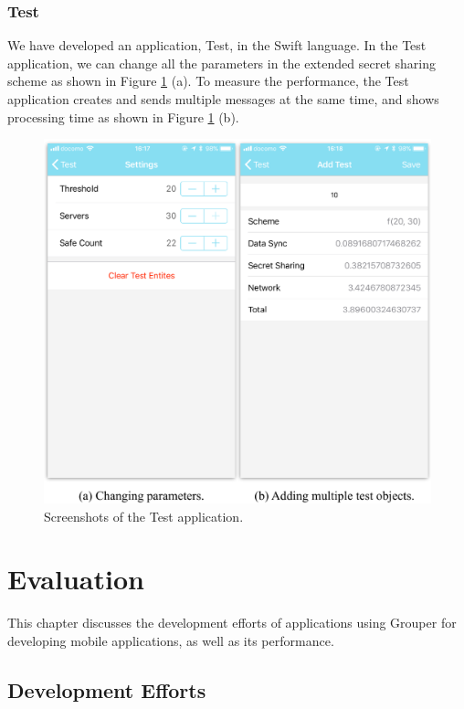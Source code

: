 \documentclass[a4paper,11pt]{report}
\begin{document}
\subsection{Test}

We have developed an application, Test, in the Swift language.
In the Test application, we can change all the parameters in the extended secret sharing scheme as shown in Figure \ref{fig:test} (a).
To measure the performance, the Test application creates and sends multiple messages at the same time, and shows processing time as shown in Figure \ref{fig:test} (b).

\begin{figure}[H]
	\centering
	\includegraphics[scale=0.62]{test}
	\caption{Screenshots of the Test application.}
	\label{fig:test}
\end{figure}

\chapter{Evaluation} \label{chapter:evaluation}

This chapter discusses the development efforts of applications using Grouper for developing mobile applications, as well as its performance.

\section{Development Efforts} \label{section:development_efforts}
\end{document}
